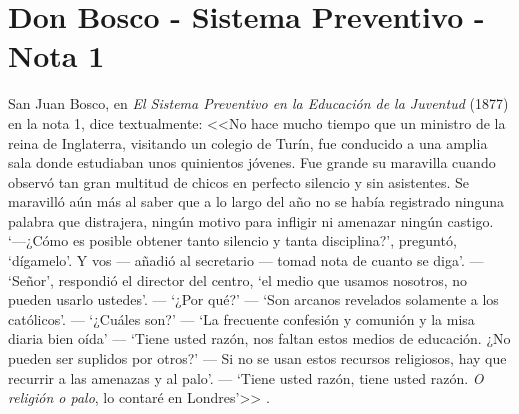 \chapter{Don Bosco - Sistema Preventivo - Nota 1}
\label{ap:preventivo}
San Juan Bosco, en \emph{El Sistema Preventivo en la Educación de la Juventud} (1877) en la nota 1, dice textualmente: <<No hace mucho tiempo que un ministro de la reina de Inglaterra, visitando un colegio de Turín, fue conducido a una amplia sala donde estudiaban unos quinientos jóvenes. Fue grande su maravilla cuando observó tan gran multitud de chicos en perfecto silencio y sin asistentes. Se maravilló aún más al saber que a lo largo del año no se había registrado ninguna palabra que distrajera, ningún motivo para infligir ni amenazar ningún castigo. `---¿Cómo es posible obtener tanto silencio y tanta disciplina?', preguntó, `dígamelo'. Y vos --- añadió al secretario --- tomad nota de cuanto se diga'. --- `Señor', respondió el director del centro, `el medio que usamos nosotros, no pueden usarlo ustedes'. --- `¿Por qué?' --- `Son arcanos revelados solamente a los católicos'. --- `¿Cuáles son?' --- `La frecuente confesión y comunión y la misa diaria bien oída' --- `Tiene usted razón, nos faltan estos medios de educación. ¿No pueden ser suplidos por otros?' --- Si no se usan estos recursos religiosos, hay que recurrir a las amenazas y al palo'. --- `Tiene usted razón, tiene usted razón. \emph{O religión o palo}, lo contaré en Londres'>> \citep{Canals95}.
